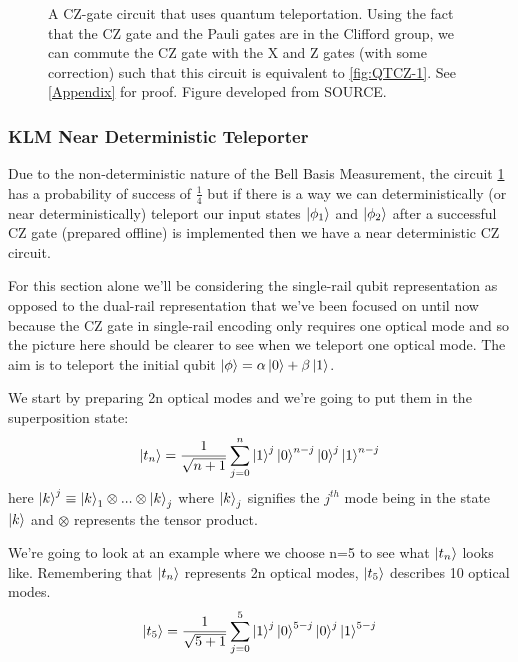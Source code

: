 \begin{figure}[!h]
\begin{tikzpicture}[x=0.75pt,y=0.75pt,yscale=-1,xscale=1]
\end{tikzpicture}


 \caption{A CZ-gate circuit that uses quantum teleportation. Using the fact that the CZ gate and the Pauli gates are in the Clifford group, we can commute the CZ gate with the X and Z gates (with some correction) such that this circuit is equivalent to \ref{fig:QTCZ-1}. See \ref{Appendix} for proof. Figure developed from SOURCE. }
    \label{fig:QTCZ-2}
\end{figure}

\subsubsection{KLM Near Deterministic Teleporter}
Due to the non-deterministic nature of the Bell Basis Measurement, the circuit \ref{fig:QTCZ-2} has a probability of success of $\frac{1}{4}$ but if there is a way we can deterministically (or near deterministically) teleport our input states $\ket{\phi_1}$ and $\ket{\phi_2}$ after a successful CZ gate (prepared offline) is implemented then we have a near deterministic CZ circuit.
\par
For this section alone we'll be considering the single-rail qubit representation as opposed to the dual-rail representation that we've been focused on until now because the CZ gate in single-rail encoding only requires one optical mode and so the picture here should be clearer to see when we teleport one optical mode. The aim is to teleport the initial qubit $\ket{\phi} = \alpha\ket{0} + \beta\ket{1}$.
\par
We start by preparing 2n optical modes and we're going to put them in the superposition state:
    \begin{equation}
        \ket{t_n} = \frac{1}{\sqrt{n+1}}\sum\limits_{j=0}^{n}\ket{1}^j\ket{0}^{n-j}\ket{0}^j\ket{1}^{n-j}
        \label{eqn: QFT Teleporter EQ}
    \end{equation}
here $\ket{k}^j \equiv \ket{k}_1 \otimes...\otimes\ket{k}_j$ where $\ket{k}_j$ signifies the $j^{th}$ mode being in the state $\ket{k}$ and $\otimes$ represents the tensor product. 
\par
We're going to look at an example where we choose n=5 to see what $\ket{t_n}$ looks like. Remembering that $\ket{t_n}$ represents 2n optical modes, $\ket{t_5}$ describes 10 optical modes.
\begin{equation}
        \ket{t_5} = \frac{1}{\sqrt{5+1}}\sum\limits_{j=0}^5\ket{1}^j\ket{0}^{5-j}\ket{0}^j\ket{1}^{5-j}
    \end{equation}
